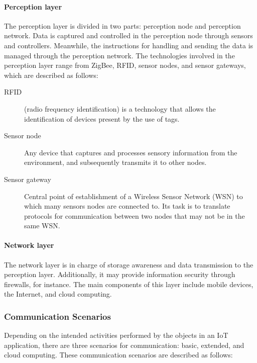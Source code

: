 \documentclass[12pt]{article}
\begin{document}
\paragraph{Perception layer} The perception layer is divided in two parts: perception node and perception network. Data is captured and controlled in the perception node through sensors and controllers. Meanwhile, the instructions for handling and sending the data is managed through the perception network. The technologies involved in the perception layer range from ZigBee, RFID, sensor nodes, and sensor gateways, which are described as follows:

\begin{description}
\item [RFID] (radio frequency identification) is a technology that allows the identification of devices present by the use of tags. 
\item [Sensor node] Any device that captures and processes sensory information from the environment, and subsequently transmits it to other nodes.
\item [Sensor gateway] Central point of establishment of a Wireless Sensor Network (WSN) to which many sensors nodes are connected to. Its task is to translate protocols for communication between two nodes that may not be in the same WSN.
\end{description}

\paragraph{Network layer} The network layer is in charge of storage awareness and data transmission to the perception layer. Additionally, it may provide information security through firewalls, for instance. The main components of this layer include mobile devices, the Internet, and cloud computing.

\subsubsection{Communication Scenarios}

Depending on the intended activities performed by the objects in an IoT application, there are three scenarios for communication: basic, extended, and cloud computing. These communication scenarios are described as follows:
\end{document}
